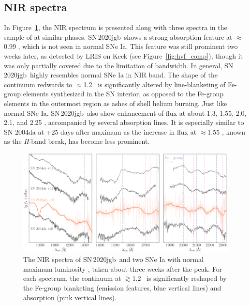 \documentclass[twocolumn]{aastex631}
\newcommand\sn{SN\,2020jgb}
\begin{document}
\subsection{NIR spectra}
In Figure~\ref{fig:NIR_spec}, the NIR spectrum is presented along with three spectra in the sample of \cite{Marion2009_NIR} at similar phases. \sn\ shows a strong absorption feature at $\approx$0.99 \micron, which is not seen in normal SNe Ia. This feature was still prominent two weeks later, as detected by LRIS on Keck (see Figure~\ref{fig:hvf_comp}), though it was only partially covered due to the limitation of bandwidth. In general, \sn\ highly resembles normal SNe Ia in NIR band. The shape of the continuum redwards to $\approx$1.2 \micron\ is significantly altered by line-blanketing of Fe-group elements synthesized in the SN interior, as opposed to the Fe-group elements in the outermost region as ashes of shell helium burning. Just like normal SNe Ia, \sn\ also show enhancement of flux at about 1.3, 1.55, 2.0, 2.1, and 2.25 \micron, accompanied by several  absorption lines. It is especially similar to SN 2004da at +25 days after maximum as the increase in flux at $\approx$1.55 \micron, known as the \textit H-band break, has become less prominent. %
\begin{figure}
    \centering
    \includegraphics[width=\textwidth]{NIR_spec.pdf}
    \caption{The NIR spectra of \sn\ and two SNe Ia with normal maximum luminosity \citep[SN 2004ab and SN 2004da,][]{Marion2009_NIR}, taken about three weeks after the peak. For each spectrum, the continuum at $\gtrsim1.2$ \micron\  is significantly reshaped by the Fe-group blanketing (emission features, blue vertical lines) and  absorption (pink vertical lines).}
    \label{fig:NIR_spec}
\end{figure}
\end{document}
